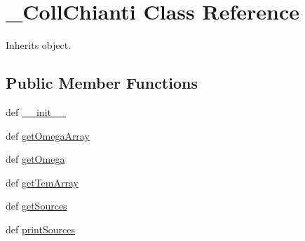 \hypertarget{classpyneb_1_1utils_1_1pn__chianti_1_1___coll_chianti}{\section{\-\_\-\-Coll\-Chianti Class Reference}
\label{classpyneb_1_1utils_1_1pn__chianti_1_1___coll_chianti}
}


Inherits object.

\subsection*{Public Member Functions}
\begin{DoxyCompactItemize}
\item 
def \hyperlink{classpyneb_1_1utils_1_1pn__chianti_1_1___coll_chianti_ac775ee34451fdfa742b318538164070e}{\-\_\-\-\_\-init\-\_\-\-\_\-}
\item 
def \hyperlink{classpyneb_1_1utils_1_1pn__chianti_1_1___coll_chianti_abe866c7263d184180cefd99da4439667}{get\-Omega\-Array}
\item 
def \hyperlink{classpyneb_1_1utils_1_1pn__chianti_1_1___coll_chianti_aaf6e92dda1e6d1aa7d06098b4e9a4e6d}{get\-Omega}
\item 
def \hyperlink{classpyneb_1_1utils_1_1pn__chianti_1_1___coll_chianti_a903ccea78642f5853c9a01b1616c6899}{get\-Tem\-Array}
\item 
def \hyperlink{classpyneb_1_1utils_1_1pn__chianti_1_1___coll_chianti_a13685d48c0180c5463a5dffebcd4fb29}{get\-Sources}
\item 
def \hyperlink{classpyneb_1_1utils_1_1pn__chianti_1_1___coll_chianti_a0120b7dbd5f911f8b1df2d2cebf6c09c}{print\-Sources}
\end{DoxyCompactItemize}
